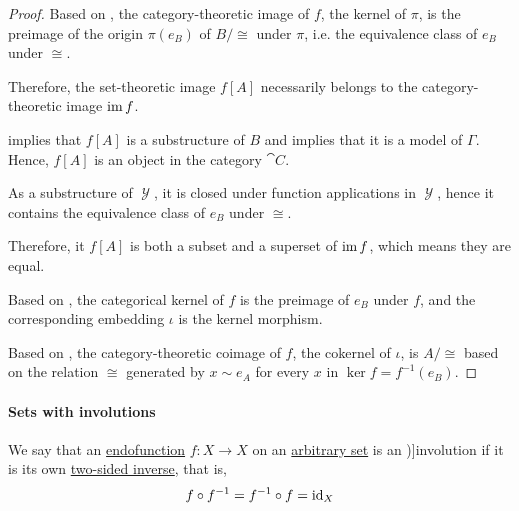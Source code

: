 \begin{proof}
  Based on , the category-theoretic image of \( f \), the kernel of \( \pi \), is the preimage of the origin \( \pi(e_B) \) of \( B / {\cong} \) under \( \pi \), i.e. the equivalence class of \( e_B \) under \( {\cong} \).

  Therefore, the set-theoretic image \( f[A] \) necessarily belongs to the category-theoretic image \( \operatorname{im} f \).

   implies that \( f[A] \) is a substructure of \( B \) and  implies that it is a model of \( \Gamma \). Hence, \( f[A] \) is an object in the category \( \cat{C} \).

  As a substructure of \( \mscrY \), it is closed under function applications in \( \mscrY \), hence it contains the equivalence class of \( e_B \) under \( {\cong} \).

  Therefore, it \( f[A] \) is both a subset and a superset of \( \operatorname{im} f \), which means they are equal.

   Based on , the categorical kernel of \( f \) is the preimage of \( e_B \) under \( f \), and the corresponding embedding \( \iota \) is the kernel morphism.

  Based on , the category-theoretic coimage of \( f \), the cokernel of \( \iota \), is \( A / {\cong} \) based on the relation \( {\cong} \) generated by \( x \sim e_A \) for every \( x \) in \( \ker f = f^{-1}(e_B) \).
\end{proof}

\paragraph{Sets with involutions}

\begin{definition}\label{def:involution}
  We say that an \hyperref[def:function/endofunction]{endofunction} \( f: X \to X \) on an \hyperref[def:set]{arbitrary set} is an \term[ru=инволюция (\cite[333]{Арнольд2012})]{involution} if it is its own \hyperref[def:morphism_invertibility/isomorphism]{two-sided inverse}, that is,
  \begin{equation*}
    f \circ f^{-1} = f^{-1} \circ f = \operatorname{id}_X
  \end{equation*}
\end{definition}

